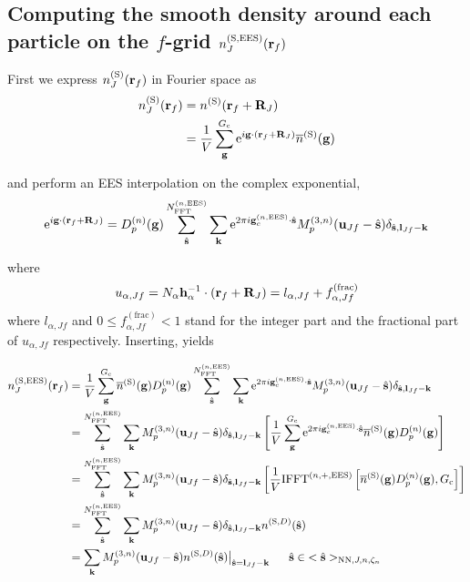 \documentclass[paper=a4, fontsize=11pt]{article} %
\numberwithin{equation}{section} %
\numberwithin{figure}{section} %
\numberwithin{table}{section} %
\newcommand{\ol}{\overline}
\newcommand{\bh}{{\bf{h}}}
\newcommand{\bu}{{\bf{u}}}
\newcommand{\bl}{{\bf{l}}}
\newcommand{\bk}{{\bf{k}}}
\newcommand{\bs}{{\bf{s}}}
\newcommand{\bg}{{\bf{g}}}
\newcommand{\br}{{\bf{r}}}
\newcommand{\bR}{{\bf{R}}}
\newcommand{\hs}{{\hat{\bf{s}}}}
\newcommand{\rS}{{\mathrm{S}}}
\newcommand{\rEES}{{\mathrm{EES}}}
\newcommand{\rNN}{{\mathrm{NN}}}
\newcommand{\re}{{\mathrm{e}}}
\newcommand{\gcnEES}{{\bg_c^{(n,\rEES)}}}
\newcommand{\al}{{\alpha}}
\newcommand{\NFFTnEES}{{N^{(n,\rEES)}_{\mathrm{FFT}}}}
\newcommand{\Gc}{{G_{\mathrm{c}}}}
\newcommand{\Dng}{{D^{(n)}_p(\bg)}}
\newcommand{\Mn}{{M_p^{(3,n)}}}
\newcommand{\IFFTnEES}{{\mathrm{IFFT}^{(n,+,\rEES)}}}
\newcommand{\hsJn}{{<\hs>_{\rNN,J,n,\zeta_n}}}
\newcommand{\hsinJn}{{\ \ \ \ \ \hs  \in  \hsJn}}
\begin{document}
\subsection{Computing the smooth density around each particle on the $f$-grid $n_J^{(\rS,\rEES)}(\br_f)$}
First we express $n_J^{(\rS)}(\br_f)$ in Fourier space as
\begin{equation}
\begin{split}
n_J^{(\rS)}(\br_f)
&= n^{(\rS)}(\br_f + \bR_J) \\
&= \frac{1}{V}\sum_\bg^{\Gc} \re^{i\bg\cdot(\br_f+\bR_J)} \ol n^{(\rS)}(\bg)
\end{split}
\end{equation}

and perform an EES interpolation on the complex exponential, 
\begin{equation}\label{eq:fmaster}
\begin{split}
\re^{i\bg\cdot(\br_f+\bR_J)}
  & = \Dng\sum_{\hat\bs}^{\NFFTnEES} \sum_{\bk} \re^{2\pi i\gcnEES  \cdot \hat\bs} \Mn(\bu_{Jf}-\hat \bs)\delta_{\hat \bs,\bl_{Jf}-\bk} \\
\end{split}
\end{equation}

where 
\begin{equation}
u_{\al,Jf} = N_\al \bh_\al^{-1}\cdot \left(\br_f+\bR_J\right) = l_{\al,Jf} + f^{(\mathrm{frac})}_{\al,Jf}
\end{equation}
where $l_{\al,Jf}$ and $0 \leq f^{(\mathrm{frac})}_{\al,Jf} < 1$ stand for the integer part and the fractional part of $u_{\al,Jf}$ respectively. Inserting, yields

\begin{equation}
\begin{split}
n_J^{(\rS,\rEES)}(\br_f)\label{eq:nSrfEES}
&= \frac{1}{V}\sum_\bg^{\Gc} \ol n^{(\rS)}(\bg) D^{(n)}_p(\bg)\sum_{\hat \bs}^{\NFFTnEES} \sum_{\bk} \re^{2\pi i\gcnEES  \cdot \hat\bs} \Mn(\bu_{Jf}-\hat \bs)\delta_{\hat \bs,\bl_{Jf}-\bk} \\
&= \sum_{\hat \bs}^{\NFFTnEES} \sum_{\bk} \Mn(\bu_{Jf}-\hat \bs)\delta_{\hat \bs,\bl_{Jf}-\bk}\left[ \frac{1}{V} \sum_{\bg}^{\Gc} \re^{2\pi i\gcnEES \cdot \hat\bs} \ol n^{(\rS)}(\bg) D^{(n)}_p(\bg) \right] \\
&= \sum_{\hat \bs}^{\NFFTnEES} \sum_{\bk} \Mn(\bu_{Jf}-\hat \bs)\delta_{\hat \bs,\bl_{Jf}-\bk}\left[\frac{1}{V} \IFFTnEES \left[ \ol n^{(\rS)}(\bg) D^{(n)}_p(\bg) ,\Gc\right] \right]\\
&= \sum_{\hat \bs}^{\NFFTnEES} \sum_{\bk} \Mn(\bu_{Jf}-\hat \bs)\delta_{\hat \bs,\bl_{Jf}-\bk} n^{(\rS,D)}(\hat \bs) \\
&= \sum_{\bk} \Mn(\bu_{Jf}-\hat \bs) n^{(\rS,D)}(\hat \bs)\big|_{\hat \bs=\bl_{Jf}-\bk} \hsinJn\\
\end{split}
\end{equation}
\end{document}
